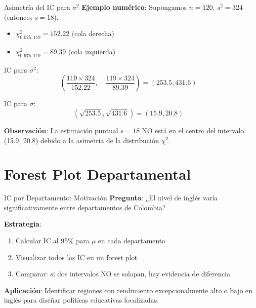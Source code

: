 \documentclass[aspectratio=169, 11pt]{beamer}
\begin{document}
\begin{frame}{Asimetría del IC para $\sigma^2$}
\textbf{Ejemplo numérico}: Supongamos $n = 120$, $s^2 = 324$ (entonces $s = 18$).

\vspace{0.3cm}
\begin{itemize}
  \item $\chi^2_{0.025, 119} = 152.22$ (cola derecha)
  \item $\chi^2_{0.975, 119} = 89.39$ (cola izquierda)
\end{itemize}

\vspace{0.3cm}
IC para $\sigma^2$:
\[
\left( \frac{119 \times 324}{152.22}, \quad \frac{119 \times 324}{89.39} \right) = (253.5, 431.6)
\]

\vspace{0.3cm}
IC para $\sigma$:
\[
(\sqrt{253.5}, \sqrt{431.6}) = (15.9, 20.8)
\]

\vspace{0.3cm}
\textbf{Observación}: La estimación puntual $s = 18$ NO está en el centro del intervalo (15.9, 20.8) debido a la asimetría de la distribución $\chi^2$.
\end{frame}

\section{Forest Plot Departamental}

\begin{frame}{IC por Departamento: Motivación}
\textbf{Pregunta}: ¿El nivel de inglés varía significativamente entre departamentos de Colombia?

\vspace{0.3cm}
\textbf{Estrategia}:
\begin{enumerate}
  \item Calcular IC al 95\% para $\mu$ en cada departamento
  \item Visualizar todos los IC en un \alert{forest plot}
  \item Comparar: si dos intervalos NO se solapan, hay evidencia de diferencia
\end{enumerate}

\vspace{0.3cm}
\textbf{Aplicación}: Identificar regiones con rendimiento excepcionalmente alto o bajo en inglés para diseñar políticas educativas focalizadas.
\end{frame}
\end{document}
